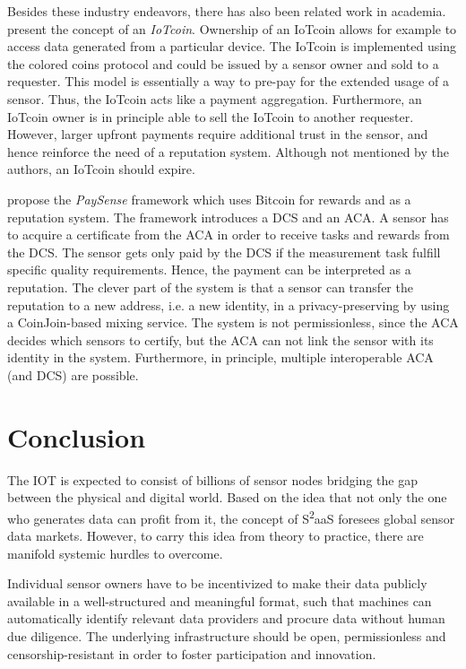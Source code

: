 Besides these industry endeavors, there has also been related work in academia. \cite{7073830} present the concept of an \emph{IoTcoin}. Ownership of an IoTcoin allows for example to access data generated from a particular device. The IoTcoin is implemented using the colored coins protocol and could be issued by a sensor owner and sold to a requester. This model is essentially a way to pre-pay for the extended usage of a sensor. Thus, the IoTcoin acts like a payment aggregation. Furthermore, an IoTcoin owner is in principle able to sell the IoTcoin to another requester. However, larger upfront payments require additional trust in the sensor, and hence reinforce the need of a reputation system. Although not mentioned by the authors, an IoTcoin should expire. 

\cite{s16060776} propose the \emph{PaySense} framework which uses Bitcoin for rewards and as a reputation system. The framework introduces a \ac{DCS} and an \ac{ACA}. A sensor has to acquire a certificate from the \ac{ACA} in order to receive tasks and rewards from the \ac{DCS}. The sensor gets only paid by the \ac{DCS} if the measurement task fulfill specific quality requirements. Hence, the payment can be interpreted as a reputation. The clever part of the system is that a sensor can transfer the reputation to a new address, i.e. a new identity, in a privacy-preserving by using a CoinJoin-based mixing service. The system is not permissionless, since the \ac{ACA} decides which sensors to certify, but the \ac{ACA} can not link the sensor with its identity in the system. Furthermore, in principle, multiple interoperable \ac{ACA} (and \ac{DCS}) are possible. 
 

\section{Conclusion}
\label{sec:s2aas_conclusion}

The \ac{IOT} is expected to consist of billions of sensor nodes bridging the gap between the physical and digital world. Based on the idea that not only the one who generates data can profit from it, the concept of S\textsuperscript{2}aaS foresees global sensor data markets. However, to carry this idea from theory to practice, there are manifold systemic hurdles to overcome.

Individual sensor owners have to be incentivized to make their data publicly available in a well-structured and meaningful format, such that machines can automatically identify relevant data providers and procure data without human due diligence. The underlying infrastructure should be open, permissionless and censorship-resistant in order to foster participation and innovation. 

